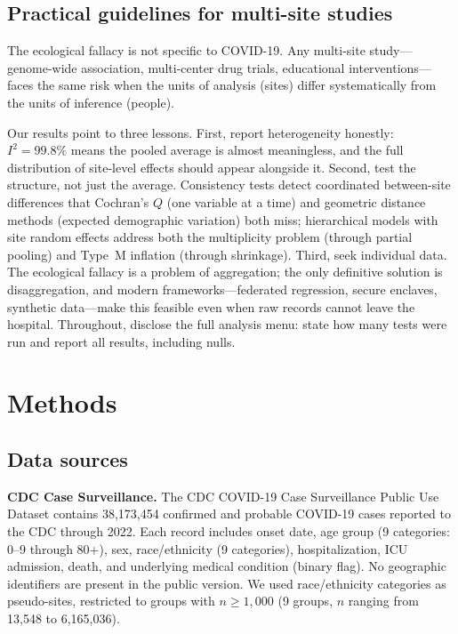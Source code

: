 \documentclass{article}
\begin{document}
\subsection{Practical guidelines for multi-site studies}

The ecological fallacy is not specific to COVID-19.  Any multi-site
study---genome-wide association, multi-center drug trials, educational
interventions---faces the same risk when the units of analysis (sites)
differ systematically from the units of inference (people).

Our results point to three lessons.  First, report heterogeneity honestly:
$I^2 = 99.8\%$ means the pooled average is almost meaningless, and the
full distribution of site-level effects should appear alongside it.
Second, test the structure, not just the average.  Consistency tests detect
coordinated between-site differences that Cochran's $Q$ (one variable at a
time) and geometric distance methods (expected demographic variation) both
miss; hierarchical models with site random effects address both the
multiplicity problem (through partial pooling) and Type~M inflation
(through shrinkage).  Third, seek individual data.  The ecological fallacy
is a problem of aggregation; the only definitive solution is
disaggregation, and modern frameworks---federated regression, secure
enclaves, synthetic data---make this feasible even when raw records cannot
leave the hospital.  Throughout, disclose the full analysis menu: state how
many tests were run and report all results, including nulls.


\section{Methods}

\subsection{Data sources}

\textbf{CDC Case Surveillance.}  The CDC COVID-19 Case Surveillance Public
Use Dataset contains 38,173,454 confirmed and probable COVID-19 cases reported
to the CDC through 2022.  Each record includes onset date, age group (9
categories: 0--9 through 80+), sex, race/ethnicity (9 categories),
hospitalization, ICU admission, death, and underlying medical condition (binary
flag).  No geographic identifiers are present in the public version.  We used
race/ethnicity categories as pseudo-sites, restricted to groups with $n \geq
1{,}000$ (9 groups, $n$ ranging from 13,548 to 6,165,036).
\end{document}
